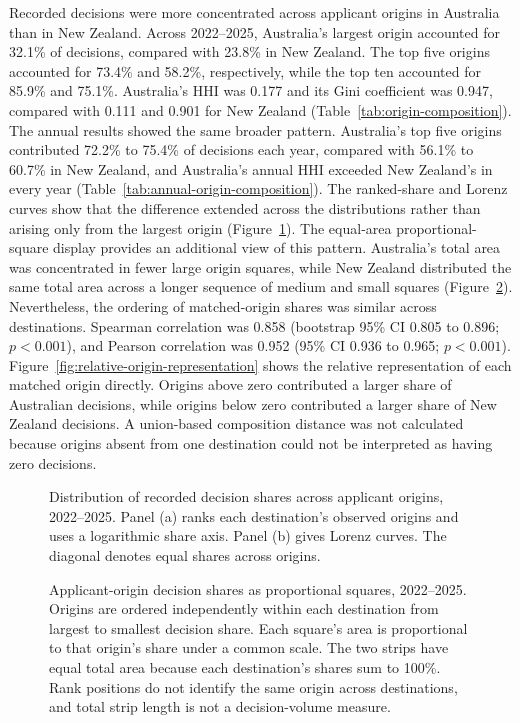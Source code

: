 \documentclass[runningheads]{llncs}
\begin{document}
Recorded decisions were more concentrated across applicant origins in Australia than in New Zealand. Across 2022--2025, Australia's largest origin accounted for 32.1\% of decisions, compared with 23.8\% in New Zealand. The top five origins accounted for 73.4\% and 58.2\%, respectively, while the top ten accounted for 85.9\% and 75.1\%. Australia's HHI was 0.177 and its Gini coefficient was 0.947, compared with 0.111 and 0.901 for New Zealand (Table~\ref{tab:origin-composition}). The annual results showed the same broader pattern. Australia's top five origins contributed 72.2\% to 75.4\% of decisions each year, compared with 56.1\% to 60.7\% in New Zealand, and Australia's annual HHI exceeded New Zealand's in every year (Table~\ref{tab:annual-origin-composition}). The ranked-share and Lorenz curves show that the difference extended across the distributions rather than arising only from the largest origin (Figure~\ref{fig:origin-composition-curves}). The equal-area proportional-square display provides an additional view of this pattern. Australia's total area was concentrated in fewer large origin squares, while New Zealand distributed the same total area across a longer sequence of medium and small squares (Figure~\ref{fig:origin-share-squares}). Nevertheless, the ordering of matched-origin shares was similar across destinations. Spearman correlation was 0.858 (bootstrap 95\% CI 0.805 to 0.896; $p<0.001$), and Pearson correlation was 0.952 (95\% CI 0.936 to 0.965; $p<0.001$). Figure~\ref{fig:relative-origin-representation} shows the relative representation of each matched origin directly. Origins above zero contributed a larger share of Australian decisions, while origins below zero contributed a larger share of New Zealand decisions. A union-based composition distance was not calculated because origins absent from one destination could not be interpreted as having zero decisions.




\begin{figure}
\centering

\caption{Distribution of recorded decision shares across applicant origins, 2022--2025. Panel (a) ranks each destination's observed origins and uses a logarithmic share axis. Panel (b) gives Lorenz curves. The diagonal denotes equal shares across origins.}
\label{fig:origin-composition-curves}
\end{figure}

\begin{figure}
\centering

\caption{Applicant-origin decision shares as proportional squares, 2022--2025. Origins are ordered independently within each destination from largest to smallest decision share. Each square's area is proportional to that origin's share under a common scale. The two strips have equal total area because each destination's shares sum to 100\%. Rank positions do not identify the same origin across destinations, and total strip length is not a decision-volume measure.}
\label{fig:origin-share-squares}
\end{figure}
\end{document}
